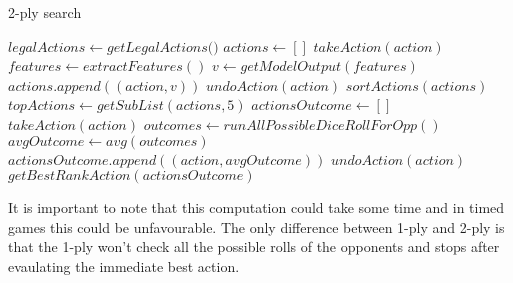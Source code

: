 \documentclass[12pt,a4paper]{article}
\begin{document}
\begin{algorithm}
    \caption{2-ply search}\label{euclid}
    \begin{algorithmic}[1]
    \State $legalActions \gets \textit{getLegalActions()}$
    \State $actions \gets []$
    \State $\textit{takeAction}(action)$
    \State $features \gets \textit{extractFeatures}()$
    \State $v \gets \textit{getModelOutput}(features)$ 
    \State $actions.\textit{append}((action,v))$
    \State $\textit{undoAction}(action)$
    \EndFor
    \State $\textit{sortActions}(actions)$ 
    \State $topActions \gets \textit{getSubList}(actions, 5)$ 
    \State $actionsOutcome \gets []$
    \State $\textit{takeAction}(action)$
    \State $outcomes \gets \textit{runAllPossibleDiceRollForOpp}()$ 
    \State $avgOutcome \gets \textit{avg}(outcomes)$
    \State $actionsOutcome.\textit{append}((action, avgOutcome))$
    \State $\textit{undoAction}(action)$
    \EndFor
    \Return $\textit{getBestRankAction}(actionsOutcome)$ 
    \end{algorithmic}
    \end{algorithm}

It is important to note that this computation could take some time and in timed games this could be unfavourable. The only difference between 1-ply and 2-ply is that the 1-ply won't check all the possible rolls of the opponents and stops after evaulating the immediate best action.


\end{document}
